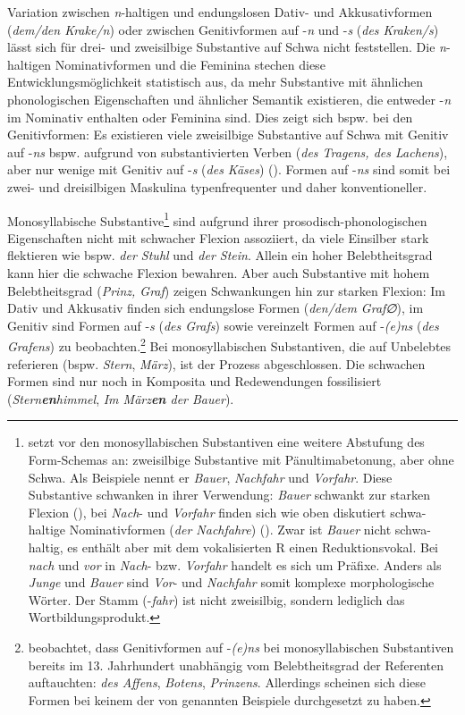 Variation zwischen \textit{n}-haltigen und endungslosen Dativ- und Akkusativformen (\textit{dem/den Krake/n}) oder zwischen Genitivformen auf -\textit{n} und -\textit{s} (\textit{des Kraken/s}) lässt sich für drei- und zweisilbige Substantive auf Schwa nicht feststellen. Die \textit{n}-haltigen Nominativformen und die Feminina stechen diese Entwicklungsmöglichkeit statistisch aus, da mehr Substantive mit ähnlichen phonologischen Eigenschaften und ähnlicher Semantik existieren, die entweder -\textit{n} im Nominativ enthalten oder Feminina sind. Dies zeigt sich bspw. bei den Genitivformen: Es existieren viele zweisilbige Substantive auf Schwa mit Genitiv auf -\textit{ns} bspw. aufgrund von substantivierten Verben (\textit{des Tragens, des Lachens}), aber nur wenige mit Genitiv auf -\textit{s} (\textit{des Käses}) (\cite[71]{Kopcke.2005}). Formen auf -\textit{ns} sind somit bei zwei- und dreisilbigen Maskulina typenfrequenter und daher konventioneller. 

Monosyllabische Substantive\footnote{\textcite[60--61]{Krischke.2012} setzt vor den monosyllabischen Substantiven eine weitere Abstufung des Form-Schemas an: zweisilbige Substantive mit Pänultimabetonung, aber ohne Schwa. Als Beispiele nennt er \textit{Bauer}, \textit{Nachfahr} und \textit{Vorfahr}. Diese Substantive schwanken in ihrer Verwendung: \textit{Bauer} schwankt zur starken Flexion (\cite[132--133]{Duden.2016}), bei \textit{Nach}- und \textit{Vorfahr} finden sich wie oben diskutiert schwa-haltige Nominativformen (\textit{der Nachfahre}) (\cite[137--138]{Kopcke.1993}). Zwar ist \textit{Bauer} nicht schwa-haltig, es enthält aber mit dem vokalisierten R einen Reduktionsvokal. Bei \textit{nach} und \textit{vor} in \textit{Nach}- bzw. \textit{Vorfahr} handelt es sich um Präfixe. Anders als \textit{Junge} und \textit{Bauer} sind \textit{Vor}- und \textit{Nachfahr} somit komplexe morphologische Wörter. Der Stamm (-\textit{fahr}) ist nicht zweisilbig, sondern lediglich das Wortbildungsprodukt.} sind aufgrund ihrer prosodisch-pho\-no\-lo\-gisch\-en Eigenschaften nicht mit schwacher Flexion assoziiert, da viele Einsilber stark flektieren wie bspw. \textit{der Stuhl} und \textit{der Stein}. Allein ein hoher Belebtheitsgrad kann hier die schwache Flexion bewahren. Aber auch Substantive mit hohem Belebtheitsgrad (\textit{Prinz, Graf}) zeigen Schwankungen hin zur starken Flexion: Im Dativ und Akkusativ finden sich endungslose Formen (\textit{den/dem Graf∅}), im Genitiv sind Formen auf  -\textit{s} (\textit{des Grafs}) sowie vereinzelt Formen auf -\textit{(e)ns} (\textit{des Grafens}) zu beobachten.\footnote{\textcite[76--77]{Krischke.2012} beobachtet, dass Genitivformen auf -\textit{(e)ns} bei monosyllabischen Substantiven bereits im 13. Jahrhundert unabhängig vom Belebtheitsgrad der Referenten auftauchten: \textit{des Affens}, \textit{Botens}, \textit{Prinzens}. Allerdings scheinen sich diese Formen bei keinem der von \textcite[76--77]{Krischke.2012} genannten Beispiele durchgesetzt zu haben.} Bei monosyllabischen Substantiven, die auf Unbelebtes referieren (bspw. \textit{Stern}, \textit{März}), ist der Prozess abgeschlossen. Die schwachen Formen sind nur noch in Komposita und Redewendungen fossilisiert (\textit{Stern\textbf{en}himmel}, \textit{Im März\textbf{en} der Bauer}). 

